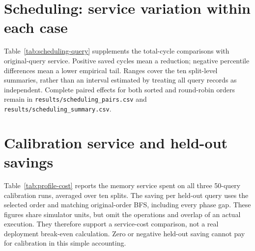 \section{Scheduling: service variation within each case}
\label{app:scheduling-detail}
Table~\ref{tab:scheduling-query} supplements the total-cycle comparisons with original-query service. Positive saved cycles mean a reduction; negative percentile differences mean a lower empirical tail. Ranges cover the ten split-level summaries, rather than an interval estimated by treating all query records as independent. Complete paired effects for both sorted and round-robin orders remain in \texttt{results/scheduling\_pairs.csv} and \texttt{results/scheduling\_summary.csv}.

\begin{table}[htbp]\centering\small
\caption[Scheduling sensitivity by original query]{Round-robin versus matching original-order BFS. Saved cycles/query are averaged across ten splits; faster-query fractions and empirical 95th-percentile changes show the observed split range. Original-query intervals include inter-phase and inter-batch gaps.}\label{tab:scheduling-query}
\resizebox{\textwidth}{!}{}
\end{table}

\section{Calibration service and held-out savings}
\label{app:profile-cost}
Table~\ref{tab:profile-cost} reports the memory service spent on all three 50-query calibration runs, averaged over ten splits. The saving per held-out query uses the selected order and matching original-order BFS, including every phase gap. These figures share simulator units, but omit the operations and overlap of an actual execution. They therefore support a service-cost comparison, not a real deployment break-even calculation. Zero or negative held-out saving cannot pay for calibration in this simple accounting.

\begin{table}[htbp]\centering\small
\caption[Profiling cost and service saving]{Mean calibration service for 150 query replays per configuration, and mean saved cycles per held-out query relative to matching original order. Positive saved cycles are favourable. Calibration is performed once per profile; its reuse lifetime is unmeasured.}\label{tab:profile-cost}
\resizebox{\textwidth}{!}{}
\end{table}

